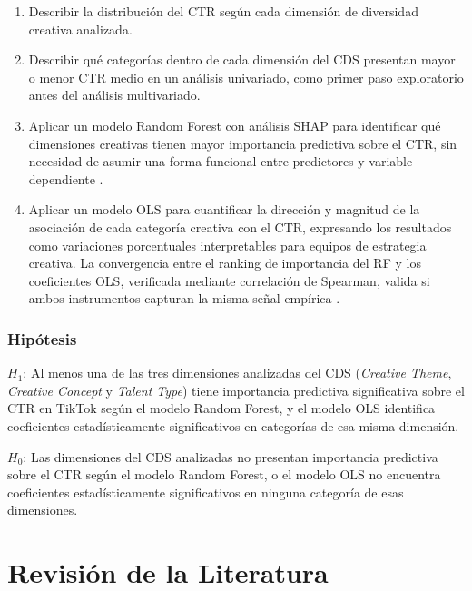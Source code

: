 \documentclass[12pt, a4paper]{report}
\begin{document}
\begin{enumerate}
  \item Describir la distribución del CTR según cada dimensión de diversidad creativa
        analizada.
  \item Describir qué categorías dentro de cada dimensión del CDS presentan mayor
        o menor CTR medio en un análisis univariado, como primer paso exploratorio
        antes del análisis multivariado.
  \item Aplicar un modelo Random Forest con análisis SHAP para identificar qué dimensiones
        creativas tienen mayor importancia predictiva sobre el CTR, sin necesidad de asumir
        una forma funcional entre predictores y variable dependiente \citep{lundberg2017, strobl2007}.
  \item Aplicar un modelo OLS para cuantificar la dirección
        y magnitud de la asociación de cada categoría creativa con el CTR, expresando los
        resultados como variaciones porcentuales interpretables para equipos de estrategia
        creativa. La convergencia entre el ranking de importancia del RF y los coeficientes
        OLS, verificada mediante correlación de Spearman, valida si ambos instrumentos
        capturan la misma señal empírica \citep{breiman2001b, mullainathan2017}.
\end{enumerate}

\subsection{Hipótesis}

$H_1$: Al menos una de las tres dimensiones analizadas del CDS (\textit{Creative Theme},
\textit{Creative Concept} y \textit{Talent Type}) tiene importancia predictiva
significativa sobre el CTR en TikTok según el modelo Random Forest, y el modelo OLS
identifica coeficientes estadísticamente significativos en categorías de esa misma
dimensión.

$H_0$: Las dimensiones del CDS analizadas no presentan importancia predictiva sobre el
CTR según el modelo Random Forest, o el modelo OLS no encuentra coeficientes
estadísticamente significativos en ninguna categoría de esas dimensiones.

\chapter{Revisión de la Literatura}
\end{document}
